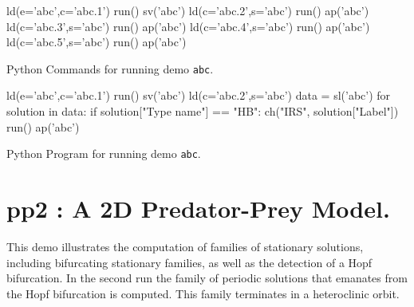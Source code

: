 \documentclass[12pt]{report}
\begin{document}
\begin{table}[htbp]
{\small 
\begin{center} 
\begin{boxedverbatim}
ld(e='abc',c='abc.1')
run()
sv('abc')
ld(c='abc.2',s='abc')
run()
ap('abc')
ld(c='abc.3',s='abc')
run()
ap('abc')
ld(c='abc.4',s='abc')
run()
ap('abc')
ld(c='abc.5',s='abc')
run()
ap('abc')
\end{boxedverbatim}
\end{center}
}
\caption{Python Commands for running demo {\tt abc}.}
\label{tbl:demo_abcP1}
\end{table}

\begin{table}[htbp]
{\small
\begin{center}
\begin{boxedverbatim}
ld(e='abc',c='abc.1')
run()
sv('abc')
ld(c='abc.2',s='abc')
data = sl('abc')
for solution in data:
    if solution["Type name"] == "HB":
        ch("IRS", solution["Label"])
        run()
        ap('abc')

\end{boxedverbatim}
\end{center}
}
\caption{Python Program for running demo {\tt abc}.}
\label{tbl:demo_abcP2}
\end{table}


\newpage
\section{ pp2 : A 2D Predator-Prey Model.} \label{sec:Demos_pp2}
This demo illustrates the computation of families of stationary
solutions, including bifurcating stationary families, as well as
the detection of a Hopf bifurcation.
In the second run the family of periodic solutions that emanates
from the Hopf bifurcation is computed. This family terminates in
a heteroclinic orbit.
\end{document}
